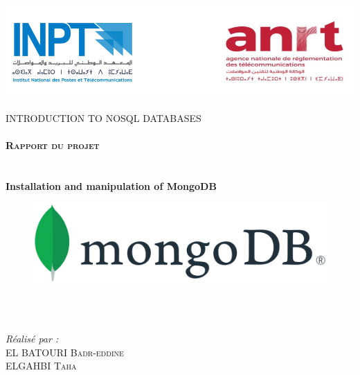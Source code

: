 \begin{titlepage}
\begin{center}

\includegraphics[width=1\textwidth]{./INPT+ANRT}~\\[1.5cm]

\textsc{\Large INTRODUCTION TO NOSQL DATABASES }\\[1.5cm]

\textsc{\Large }\\[0.4cm]

\textsc{\LARGE \textbf{Rapport du projet}}\\[0.5cm]



\HRule \\[1cm]



{\huge \bfseries \\ Installation and manipulation of MongoDB \\ }
\begin{figure}[!htb] 
\begin{center} 
\includegraphics[width=.8\linewidth]{MongoDB} 
\end{center} 
\end{figure}  \FloatBarrier
\\
\HRule \\[1.5cm]
\vspace{1.2cm}

\begin{minipage}{0.4\textwidth}
\begin{flushleft} \large
\emph{Réalisé par :}\\[0.5 cm]
EL BATOURI  \textsc{ Badr-eddine}\\
ELGAHBI  \textsc{ Taha}\\


\end{flushleft}
\end{minipage}
\end{center}
\end{titlepage}
